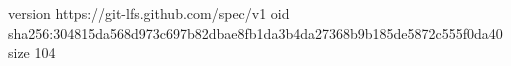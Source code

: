 version https://git-lfs.github.com/spec/v1
oid sha256:304815da568d973c697b82dbae8fb1da3b4da27368b9b185de5872c555f0da40
size 104
